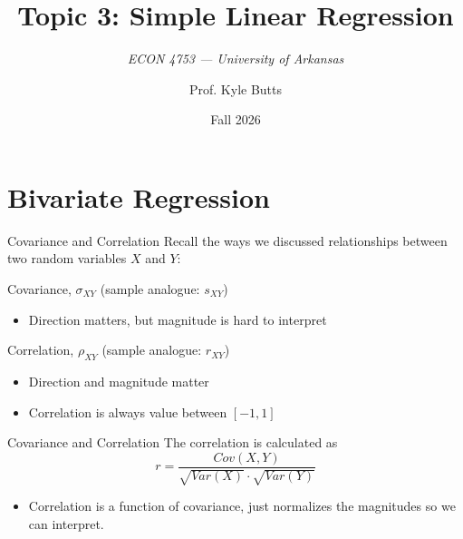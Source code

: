 \documentclass[aspectratio=169,t,11pt,table]{beamer}
\title{Topic 3: Simple Linear Regression}
\subtitle{\it  ECON 4753 — University of Arkansas}
\date{Fall 2026}
\author{Prof. Kyle Butts}
\begin{document}
\begin{frame}
\maketitle

\end{frame}

\section{Bivariate Regression}

\begin{frame}{Covariance and Correlation}
  Recall the ways we discussed relationships between two random variables $X$ and $Y$:

  \bigskip
  Covariance, $\sigma_{XY}$ (sample analogue: $s_{XY}$)
        
  \begin{itemize}
    \item Direction matters, but magnitude is hard to interpret
  \end{itemize}
        
  \bigskip
  Correlation, $\rho_{XY}$ (sample analogue: $r_{XY}$)
  
  \begin{itemize}
    \item Direction and magnitude matter
    
    \item Correlation is always value between $[-1, 1]$
  \end{itemize}
\end{frame}

\begin{frame}{Covariance and Correlation}
  The \alert{correlation} is calculated as
  \begin{equation}\label{eq:correlation}
    r = \frac{Cov(X, Y)}{\sqrt{Var(X)} \cdot \sqrt{Var(Y)}}
  \end{equation}

  \begin{itemize}
    \item Correlation is a function of covariance, just normalizes the magnitudes so we can interpret.
  \end{itemize}
\end{frame}
\end{document}
